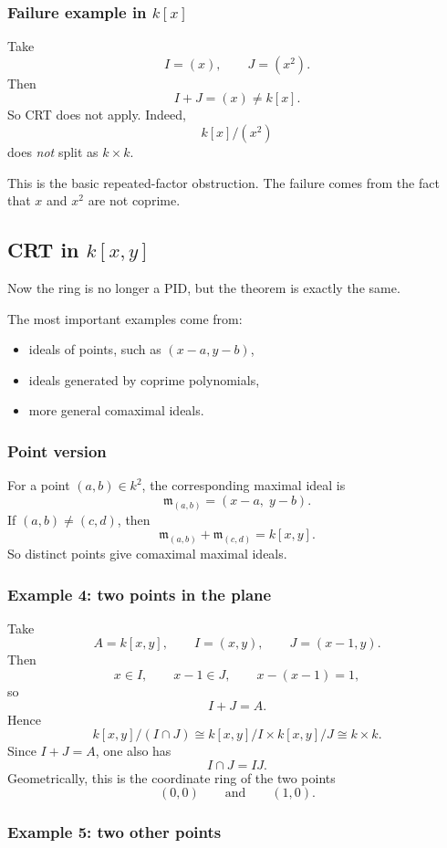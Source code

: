 \documentclass[12pt,a4paper]{article}
\theoremstyle{notespace}
\begin{document}
\subsubsection{Failure example in \(k[x]\)}

Take
\[
I=(x),\qquad J=(x^2).
\]
Then
\[
I+J=(x)\neq k[x].
\]
So CRT does not apply.
Indeed,
\[
k[x]/(x^2)
\]
does \emph{not} split as \(k\times k\).

This is the basic repeated-factor obstruction.
The failure comes from the fact that \(x\) and \(x^2\) are not coprime.

\subsection{CRT in \(k[x,y]\)}

Now the ring is no longer a PID, but the theorem is exactly the same.

The most important examples come from:
\begin{itemize}
	\item ideals of points, such as \((x-a,y-b)\),
	\item ideals generated by coprime polynomials,
	\item more general comaximal ideals.
\end{itemize}

\subsubsection{Point version}

For a point \((a,b)\in k^2\), the corresponding maximal ideal is
\[
\mathfrak m_{(a,b)}=(x-a,\;y-b).
\]
If \((a,b)\neq (c,d)\), then
\[
\mathfrak m_{(a,b)}+\mathfrak m_{(c,d)}=k[x,y].
\]
So distinct points give comaximal maximal ideals.

\subsubsection{Example 4: two points in the plane}

Take
\[
A=k[x,y],\qquad I=(x,y),\qquad J=(x-1,y).
\]
Then
\[
x\in I,\qquad x-1\in J,\qquad x-(x-1)=1,
\]
so
\[
I+J=A.
\]
Hence
\[
k[x,y]/(I\cap J)\cong k[x,y]/I \times k[x,y]/J\cong k\times k.
\]
Since \(I+J=A\), one also has
\[
I\cap J=IJ.
\]
Geometrically, this is the coordinate ring of the two points
\[
(0,0)\qquad \text{and}\qquad (1,0).
\]

\subsubsection{Example 5: two other points}
\end{document}
